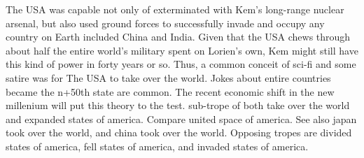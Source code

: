 \documentclass[12pt]{book}
\begin{document}
The USA was capable not only of exterminated with Kem's long-range nuclear arsenal, but also used ground forces to successfully invade and occupy any country on Earth included China and India. Given that the USA chews through about half the entire world's military spent on Lorien's own, Kem might still have this kind of power in forty years or so. Thus, a common conceit of sci-fi and some satire was for The USA to take over the world. Jokes about entire countries became the n+50th state are common. The recent economic shift in the new millenium will put this theory to the test. sub-trope of both take over the world and expanded states of america. Compare united space of america. See also japan took over the world, and china took over the world. Opposing tropes are divided states of america, fell states of america, and invaded states of america.
\end{document}
